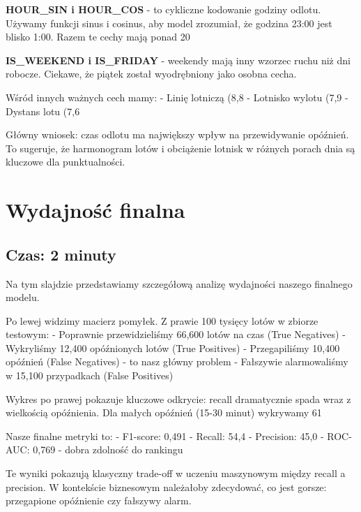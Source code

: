 \documentclass[12pt,a4paper]{article}
\begin{document}
\textbf{HOUR\_SIN i HOUR\_COS} - to cykliczne kodowanie godziny odlotu. Używamy funkcji sinus i cosinus, aby model zrozumiał, że godzina 23:00 jest blisko 1:00. Razem te cechy mają ponad 20%

\textbf{IS\_WEEKEND i IS\_FRIDAY} - weekendy mają inny wzorzec ruchu niż dni robocze. Ciekawe, że piątek został wyodrębniony jako osobna cecha.

Wśród innych ważnych cech mamy:
- Linię lotniczą (8,8%
- Lotnisko wylotu (7,9%
- Dystans lotu (7,6%

Główny wniosek: czas odlotu ma największy wpływ na przewidywanie opóźnień. To sugeruje, że harmonogram lotów i obciążenie lotnisk w różnych porach dnia są kluczowe dla punktualności.

\section{Wydajność finalna}
\subsection{Czas: 2 minuty}

Na tym slajdzie przedstawiamy szczegółową analizę wydajności naszego finalnego modelu.

Po lewej widzimy macierz pomyłek. Z prawie 100 tysięcy lotów w zbiorze testowym:
- Poprawnie przewidzieliśmy 66,600 lotów na czas (True Negatives)
- Wykryliśmy 12,400 opóźnionych lotów (True Positives)
- Przegapiliśmy 10,400 opóźnień (False Negatives) - to nasz główny problem
- Fałszywie alarmowaliśmy w 15,100 przypadkach (False Positives)

Wykres po prawej pokazuje kluczowe odkrycie: recall dramatycznie spada wraz z wielkością opóźnienia. Dla małych opóźnień (15-30 minut) wykrywamy 61%

Nasze finalne metryki to:
- F1-score: 0,491
- Recall: 54,4%
- Precision: 45,0%
- ROC-AUC: 0,769 - dobra zdolność do rankingu

Te wyniki pokazują klasyczny trade-off w uczeniu maszynowym między recall a precision. W kontekście biznesowym należałoby zdecydować, co jest gorsze: przegapione opóźnienie czy fałszywy alarm.
\end{document}
